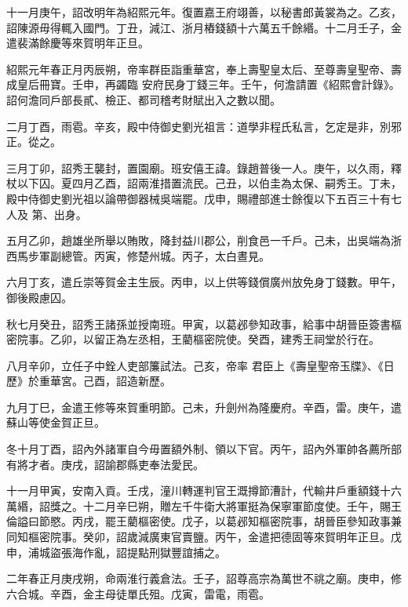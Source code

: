 \begin{pinyinscope}
 十一月庚午，詔改明年為紹熙元年。復置嘉王府翊善，以秘書郎黃裳為之。乙亥，詔陳源毋得輒入國門。丁丑，減江、浙月樁錢額十六萬五千餘緡。十二月壬子，金遣裴滿餘慶等來賀明年正旦。



 紹熙元年春正月丙辰朔，帝率群臣詣重華宮，奉上壽聖皇太后、至尊壽皇聖帝、壽成皇后冊寶。壬申，再蠲臨
 安府民身丁錢三年。壬午，何澹請置《紹熙會計錄》。詔何澹同戶部長貳、檢正、都司稽考財賦出入之數以聞。



 二月丁酉，雨雹。辛亥，殿中侍御史劉光祖言：道學非程氏私言，乞定是非，別邪正。從之。



 三月丁卯，詔秀王襲封，置園廟。班安僖王諱。錄趙普後一人。庚午，以久雨，釋杖以下囚。夏四月乙酉，詔兩淮措置流民。己丑，以伯圭為太保、嗣秀王。丁未，殿中侍御史劉光祖以論帶御器械吳端罷。戊申，賜禮部進士餘復以下五百三十有七人及
 第、出身。



 五月乙卯，趙雄坐所舉以賄敗，降封益川郡公，削食邑一千戶。己未，出吳端為浙西馬步軍副總管。丙寅，修楚州城。丙子，太白晝見。



 六月丁亥，遣丘崇等賀金主生辰。丙申，以上供等錢償廣州放免身丁錢數。甲午，御後殿慮囚。



 秋七月癸丑，詔秀王諸孫並授南班。甲寅，以葛邲參知政事，給事中胡晉臣簽書樞密院事。乙卯，以留正為左丞相，王藺樞密院使。癸酉，建秀王祠堂於行在。



 八月辛卯，立任子中銓人吏部簾試法。己亥，帝率
 君臣上《壽皇聖帝玉牒》、《日歷》於重華宮。己酉，詔造新歷。



 九月丁巳，金遣王修等來賀重明節。己未，升劍州為隆慶府。辛酉，雷。庚午，遣蘇山等使金賀正旦。



 冬十月丁酉，詔內外諸軍自今毋置額外制、領以下官。丙午，詔內外軍帥各薦所部有將才者。庚戌，詔諭郡縣吏奉法愛民。



 十一月甲寅，安南入貢。壬戌，潼川轉運判官王溉撙節漕計，代輸井戶重額錢十六萬緡，詔獎之。十二月辛巳朔，贈左千牛衛大將軍挺為保寧軍節度使。壬午，賜王
 倫謚曰節愍。丙戌，罷王藺樞密使。戊子，以葛邲知樞密院事，胡晉臣參知政事兼同知樞密院事。癸卯，詔歲減廣東官賣鹽。丙午，金遣把德固等來賀明年正旦。戊申，浦城盜張海作亂，詔提點刑獄豐誼捕之。



 二年春正月庚戌朔，命兩淮行義倉法。壬子，詔尊高宗為萬世不祧之廟。庚申，修六合城。辛酉，金主母徒單氏殂。戊寅，雷電，雨雹。




\end{pinyinscope}
